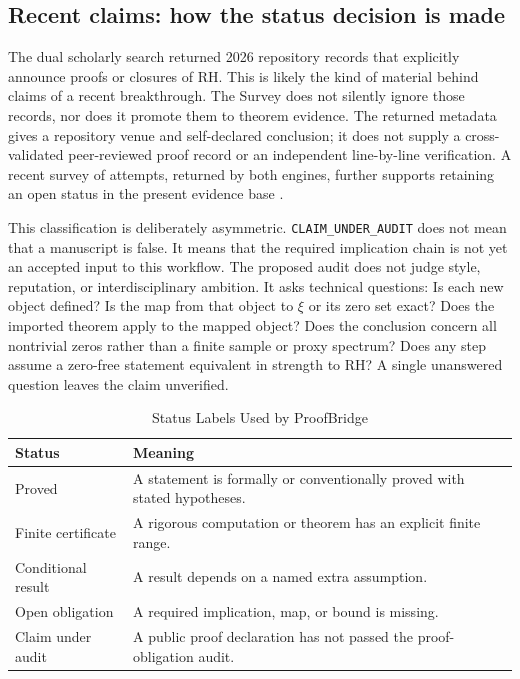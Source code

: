 \documentclass[conference]{../../../../Conference-LaTeX-template_10-17-19/IEEEtran}
\begin{document}
\subsection{Recent claims: how the status decision is made}
The dual scholarly search returned 2026 repository records that explicitly announce proofs or closures of RH. This is likely the kind of material behind claims of a recent breakthrough. The Survey does not silently ignore those records, nor does it promote them to theorem evidence. The returned metadata gives a repository venue and self-declared conclusion; it does not supply a cross-validated peer-reviewed proof record or an independent line-by-line verification. A recent survey of attempts, returned by both engines, further supports retaining an open status in the present evidence base \cite{spigler}.

This classification is deliberately asymmetric. \texttt{CLAIM\_UNDER\_AUDIT} does not mean that a manuscript is false. It means that the required implication chain is not yet an accepted input to this workflow. The proposed audit does not judge style, reputation, or interdisciplinary ambition. It asks technical questions: Is each new object defined? Is the map from that object to $\xi$ or its zero set exact? Does the imported theorem apply to the mapped object? Does the conclusion concern all nontrivial zeros rather than a finite sample or proxy spectrum? Does any step assume a zero-free statement equivalent in strength to RH? A single unanswered question leaves the claim unverified.

\begin{table}[t]
\caption{Status Labels Used by ProofBridge}
\centering\small
\begin{tabular}{p{}p{}}
\toprule
Status & Meaning\\
\midrule
Proved & A statement is formally or conventionally proved with stated hypotheses.\\
Finite certificate & A rigorous computation or theorem has an explicit finite range.\\
Conditional result & A result depends on a named extra assumption.\\
Open obligation & A required implication, map, or bound is missing.\\
Claim under audit & A public proof declaration has not passed the proof-obligation audit.\\
\bottomrule
\end{tabular}
\end{table}
\end{document}
